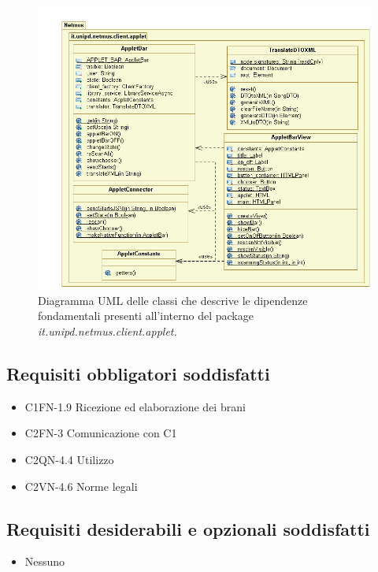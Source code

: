 \begin{figure}[h]
  \centering
  \includegraphics[width=13cm]{img/DP/netmus_client_applet.png}
\caption{Diagramma UML delle classi che descrive le dipendenze
fondamentali presenti all'interno del package
\emph{it.unipd.netmus.client.applet.}}
\end{figure}


\subsection*{Requisiti obbligatori soddisfatti}
\begin{itemize}
    \item C1FN-1.9 Ricezione ed elaborazione dei brani
    \item C2FN-3 Comunicazione con C1
    \item C2QN-4.4 Utilizzo
    \item C2VN-4.6 Norme legali
\end{itemize}
\subsection*{Requisiti desiderabili e opzionali soddisfatti}
\begin{itemize}
    \item Nessuno
\end{itemize}
